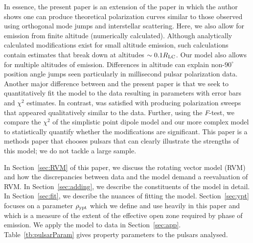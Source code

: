 In essence, the present paper is an extension of the \cite{karastergiou2009complex}
paper in which the author shows one can produce theoretical 
polarization curves similar to those observed using 
orthogonal mode jumps and interstellar scattering. 
Here, we also allow for emission from finite altitude (numerically calculated).  
Although analytically calculated modifications exist for small altitude emission, 
such calculations contain estimates that break down at altitudes $\sim 0.1R_{\rm{LC}}$.
Our model also allows for multiple altitudes of emission.  Differences in 
altitude can explain non-$90^\circ$ position angle jumps seen 
particularly in millisecond pulsar polarization data.
Another major difference between \cite{karastergiou2009complex} and the present paper is that we 
seek to quantitatively fit the model to the data 
resulting in parameters with error bars and $\chi^2$ estimates. 
In contrast, \cite{karastergiou2009complex} was satisfied with producing polarization 
sweeps that appeared qualitatively similar to the data.
Further, using the \textit{F}-test, we compare the $\chi^2$ of the simplistic point dipole model 
and our more complex model to statistically quantify
whether the modifications are significant.
This paper is a methods paper that chooses pulsars that can 
clearly illustrate the strengths of this model; we do not tackle a large sample.

In Section~\ref{sec:RVM} of this paper, we discuss the rotating
vector model (RVM) and how the discrepancies between
data and the model demand a reevaluation of RVM.
In Section~\ref{sec:adding}, we describe the constituents of the
model in detail.  In Section~\ref{sec:fit}, we describe
the nuances of fitting the model.  Section~\ref{sec:ypt}
focuses on a parameter $\rho_{\rm{ypt}}$ which we define and use heavily
in this paper and which is a measure of the extent of 
the effective open zone required by phase of emission.  We apply the model
to data in Section~\ref{sec:app}. Table~\ref{tb:pulsarParam} gives
property parameters to the pulsars analysed.

